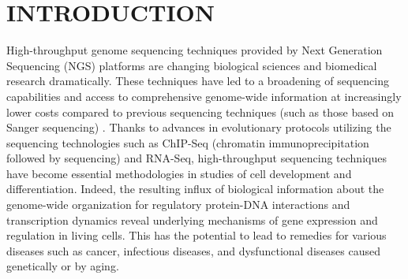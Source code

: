 \documentclass{cpeauth}
\begin{document}
%
%
%
%
%



\section{INTRODUCTION} 




High-throughput genome sequencing techniques provided by Next
Generation Sequencing (NGS) platforms are changing biological sciences
and biomedical research dramatically\cite{mardis2008-tig,mardis2008-arghg}. These techniques
have led to a broadening of sequencing capabilities and access to
comprehensive genome-wide information at increasingly lower costs
compared to previous sequencing techniques (such as those based on
Sanger sequencing)
\cite{metzker2010,mardis2008-tig,mardis2008-arghg,gilad2009,mortazavi2008,sorek2010}.
Thanks to advances in evolutionary protocols utilizing the sequencing technologies such as ChIP-Seq
(chromatin immunoprecipitation followed by sequencing) and RNA-Seq, high-throughput
sequencing techniques have become essential methodologies in studies of cell development and
differentiation\cite{wang2009-natrevgen,pepke2009,gilad2009,mortazavi2008,sorek2010}.
Indeed, the resulting influx of biological information about the
genome-wide organization for regulatory protein-DNA interactions and transcription dynamics reveal underlying mechanisms of gene expression and regulation in living cells. This has the potential to lead to remedies
for various diseases such as cancer, infectious diseases, and
dysfunctional diseases caused genetically or by
aging\cite{amaral2008,encode2007,baek2008,costa2009}.
\end{document}
